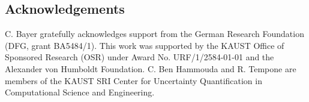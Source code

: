 \documentclass[ima, 20pt, portrait, plainboxedsections]{sciposter}
\begin{document}
\begin{multicols}{3}
\section*{Acknowledgements}
C. Bayer gratefully acknowledges support from the German Research Foundation (DFG, grant BA5484/1). This work was supported by the KAUST Office of Sponsored Research (OSR) under Award No. URF/1/2584-01-01 and the Alexander von Humboldt Foundation. C. Ben Hammouda and R. Tempone are members of the KAUST SRI Center for Uncertainty Quantification in Computational Science and Engineering. 

\footnotesize



\end{multicols}
\end{document}
